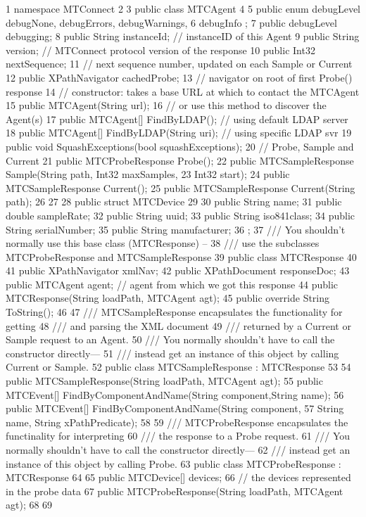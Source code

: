  1 namespace MTConnect
 2 {
 3     public class MTCAgent
 4     {
 5         public enum debugLevel { debugNone, debugErrors, debugWarnings, 
 6                debugInfo };
 7         public debugLevel debugging;
 8         public String instanceId;  // instanceID of this Agent
 9         public String version;  // MTConnect protocol version of the response
10         public Int32 nextSequence;  
11                // next sequence number, updated on each Sample or Current
12         public XPathNavigator cachedProbe; 
13                // navigator on root of first Probe() response
14         // constructor: takes a base URL at which to contact the MTCAgent
15         public MTCAgent(String url);
16         // or use this method to discover the Agent(s)
17         public MTCAgent[] FindByLDAP();   // using default LDAP server
18         public MTCAgent[] FindByLDAP(String uri); // using specific LDAP svr
19         public void SquashExceptions(bool squashExceptions);
20         // Probe, Sample and Current
21         public MTCProbeResponse Probe();
22         public MTCSampleResponse Sample(String path, Int32 maxSamples, 
23                                  Int32 start);
24         public MTCSampleResponse Current();
25         public MTCSampleResponse Current(String path);
26 
27     }
28     public struct MTCDevice
29     {
30         public String name;
31         public double sampleRate;
32         public String uuid;
33         public String iso841class;
34         public String serialNumber;
35         public String manufacturer;
36     };
37     ///  You shouldn't normally use this base class (MTCResponse) -- 
38     ///    use the subclasses MTCProbeResponse and MTCSampleResponse 
39     public class MTCResponse
40     {
41         public XPathNavigator xmlNav;
42         public XPathDocument responseDoc;
43         public MTCAgent agent;  // agent from which we got this response
44         public MTCResponse(String loadPath, MTCAgent agt);
45         public override String ToString();
46     }
47     /// MTCSampleResponse encapsulates the functionality for getting 
48     /// and parsing the XML document
49     /// returned by a Current or Sample request to an Agent.
50     /// You normally shouldn't have to call the constructor directly---
51     /// instead get an instance of this object by calling Current or Sample.
52     public class MTCSampleResponse : MTCResponse
53     {
54         public MTCSampleResponse(String loadPath, MTCAgent agt);
55         public MTCEvent[] FindByComponentAndName(String component,String name);
56         public MTCEvent[] FindByComponentAndName(String component,
57                           String name, String xPathPredicate);
58     }
59     /// MTCProbeResponse encapsulates the functinality for interpreting
60     /// the response to a Probe request.
61     /// You normally shouldn't have to call the constructor directly---
62     /// instead get an instance of this object by calling Probe.
63     public class MTCProbeResponse : MTCResponse
64     {
65         public MTCDevice[] devices;  
66                // the devices represented in the probe data
67         public MTCProbeResponse(String loadPath, MTCAgent agt);
68     }
69 }
